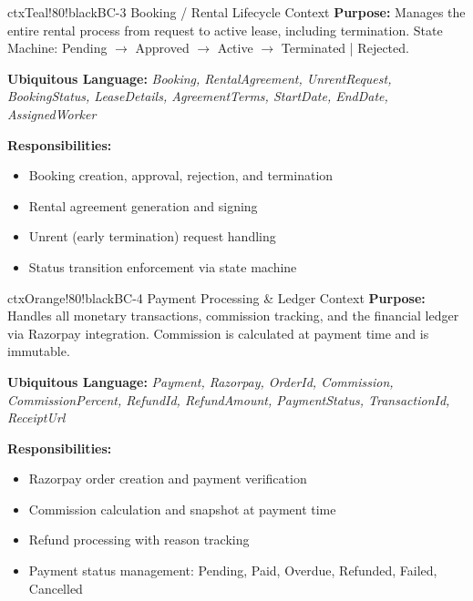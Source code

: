 \documentclass[12pt,a4paper]{article}
\begin{document}
\vspace{0.5em}

\begin{contextbox}{ctxTeal!80!black}{BC-3 \quad Booking / Rental Lifecycle Context}
\textbf{Purpose:} Manages the entire rental process from request to active lease, including termination. State Machine: Pending $\rightarrow$ Approved $\rightarrow$ Active $\rightarrow$ Terminated | Rejected.

\textbf{Ubiquitous Language:} \textit{Booking, RentalAgreement, UnrentRequest, BookingStatus, LeaseDetails, AgreementTerms, StartDate, EndDate, AssignedWorker}

\textbf{Responsibilities:}
\begin{itemize}
  \item Booking creation, approval, rejection, and termination
  \item Rental agreement generation and signing
  \item Unrent (early termination) request handling
  \item Status transition enforcement via state machine
\end{itemize}
\end{contextbox}

\vspace{0.5em}

\begin{contextbox}{ctxOrange!80!black}{BC-4 \quad Payment Processing \& Ledger Context}
\textbf{Purpose:} Handles all monetary transactions, commission tracking, and the financial ledger via Razorpay integration. Commission is calculated at payment time and is immutable.

\textbf{Ubiquitous Language:} \textit{Payment, Razorpay, OrderId, Commission, CommissionPercent, RefundId, RefundAmount, PaymentStatus, TransactionId, ReceiptUrl}

\textbf{Responsibilities:}
\begin{itemize}
  \item Razorpay order creation and payment verification
  \item Commission calculation and snapshot at payment time
  \item Refund processing with reason tracking
  \item Payment status management: Pending, Paid, Overdue, Refunded, Failed, Cancelled
\end{itemize}
\end{contextbox}

\end{document}
